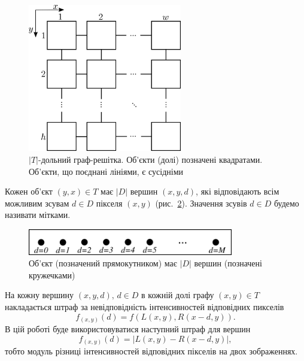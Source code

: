 \begin{figure}[h]
  \centering
  \includegraphics[width=0.6\textwidth]{images/grid_graph_pixels}
  \caption{$\left|T \right|$-дольний граф-решітка.
           Об'єкти (долі) позначені квадратами.
           Об'єкти, що поєднані лініями, є сусідніми}
  \label{fig:grid:graph:pixels}
\end{figure}


Кожен об'єкт $\left(y, x \right) \in T$ має $\left| D \right| $ вершин
$ \left( x, y, d \right)$,
які відповідають всім можливим зсувам $d \in D$ пікселя $\left(x, y \right)$
(рис.~\ref{fig:object:vertices}).
Значення зсувів $d \in D$ будемо називати мітками.

\begin{figure}[h]
  \centering
  \includegraphics[width=0.8\textwidth]{images/object_with_vertices}
  \caption{Об'єкт (позначений прямокутником) має $\left| D \right|$ вершин
           (позначені кружечками)}
  \label{fig:object:vertices}
\end{figure}

На кожну вершину $\left(x, y, d \right), \, d \in D$ в кожній долі графу
$\left(x, y \right) \in T$
накладається штраф за невідповідність інтенсивностей відповідних пикселів
\begin{equation*}
    f_{\left(x, y \right)} \left(d \right) =
    f \left(
        L \left(x, y\right),
        R \left(x - d, y \right)
    \right).
\end{equation*}
В цій роботі буде використовуватися наступний штраф для вершин
\begin{equation*}
    f_{\left(x, y \right)} \left( d \right) =
        \left| L \left(x, y \right) - R \left( x - d, y \right) \right|,
\end{equation*}
тобто модуль різниці інтенсивностей відповідних пікселів на двох зображеннях.

